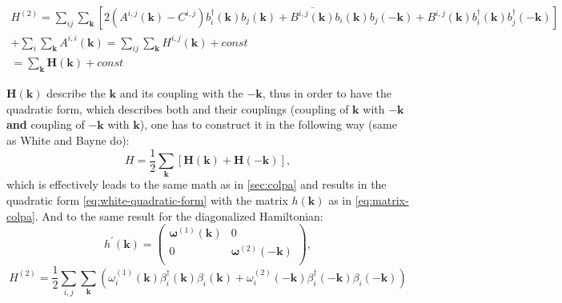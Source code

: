 \documentclass[a4paper,12pt]{article}
\begin{document}
            \begin{multline}
                H^{(2)} = \sum_{ij}\sum_{\boldsymbol{k}}\left[2(A^{i,j}(\boldsymbol{k}) - C^{i,j})b^{\dag}_{i}(\boldsymbol{k})b_{j}(\boldsymbol{k}) + 
                \overline{B^{i,j}(\boldsymbol{k})}b_{i}(\boldsymbol{k})b_{j}(-\boldsymbol{k}) +
                B^{i,j}(\boldsymbol{k})b^{\dag}_{i}(\boldsymbol{k})b^{\dag}_{j}(-\boldsymbol{k})\right]\\
                +\sum_i \sum_{\boldsymbol{k}} A^{i,i}(\boldsymbol{k}) 
                = \sum_{ij}\sum_{\boldsymbol{k}} H^{i,j}(\boldsymbol{k}) 
                + const \\ 
                = \sum_{\boldsymbol{k}} \boldsymbol{H}(\boldsymbol{k}) 
                + const
            \end{multline}

            $\boldsymbol{H}(\boldsymbol{k})$ describe the $\boldsymbol{k}$ and its coupling with the $-\boldsymbol{k}$, 
            thus in order to have the quadratic form, which describes both and their couplings 
            (coupling of $\boldsymbol{k}$ with $-\boldsymbol{k}$ \textbf{and} coupling of $-\boldsymbol{k}$ with $\boldsymbol{k}$), 
            one has to construct it in the following way (same as White and Bayne do):
            \begin{equation}
                H = \dfrac{1}{2}\sum_{\boldsymbol{k}} \left[\boldsymbol{H}(\boldsymbol{k}) + \boldsymbol{H}(-\boldsymbol{k})\right],
            \end{equation}
            which is effectively leads to the same math as in \ref{sec:colpa} and results in the quadratic form \eqref{eq:white-quadratic-form} 
            with the matrix $h(\boldsymbol{k})$ as in \eqref{eq:matrix-colpa}. And to the same result for the diagonalized Hamiltonian:
            \begin{equation}
                h^{\prime}(\boldsymbol{k}) = 
                \begin{pmatrix}
                    \boldsymbol{\omega}^{(1)}(\boldsymbol{k}) & 0 \\
                    0 & \boldsymbol{\omega}^{(2)}(-\boldsymbol{k}) \\
                \end{pmatrix}, 
            \end{equation}
            \begin{equation}
                H^{(2)} = \dfrac{1}{2}\sum_{i,j}\sum_{\boldsymbol{k}}\left(\omega_i^{(1)}(\boldsymbol{k})\beta^{\dag}_i(\boldsymbol{k})\beta_i(\boldsymbol{k}) + 
                \omega_i^{(2)}(-\boldsymbol{k})\beta^{\dag}_i(-\boldsymbol{k})\beta_i(-\boldsymbol{k})\right) \label{eq:white-diagonalized}
            \end{equation}
\end{document}

